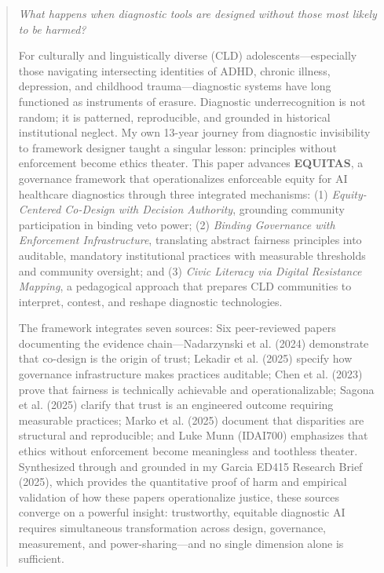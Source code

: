 \documentclass[12pt,a4paper]{article}
\begin{document}
\clearpage

\begin{abstract}

\textit{What happens when diagnostic tools are designed without those most likely to be harmed?}

For culturally and linguistically diverse (CLD) adolescents—especially those navigating intersecting identities of ADHD, chronic illness, depression, and childhood trauma—diagnostic systems have long functioned as instruments of erasure. Diagnostic underrecognition is not random; it is patterned, reproducible, and grounded in historical institutional neglect. My own 13-year journey from diagnostic invisibility to framework designer taught a singular lesson: principles without enforcement become ethics theater. This paper advances \textbf{EQUITAS}, a governance framework that operationalizes enforceable equity for AI healthcare diagnostics through three integrated mechanisms: (1) \textit{Equity-Centered Co-Design with Decision Authority}, grounding community participation in binding veto power; (2) \textit{Binding Governance with Enforcement Infrastructure}, translating abstract fairness principles into auditable, mandatory institutional practices with measurable thresholds and community oversight; and (3) \textit{Civic Literacy via Digital Resistance Mapping}, a pedagogical approach that prepares CLD communities to interpret, contest, and reshape diagnostic technologies.

\vspace{0.5em}

The framework integrates seven sources: Six peer-reviewed papers documenting the evidence chain—Nadarzynski et al. (2024) demonstrate that co-design is the origin of trust; Lekadir et al. (2025) specify how governance infrastructure makes practices auditable; Chen et al. (2023) prove that fairness is technically achievable and operationalizable; Sagona et al. (2025) clarify that trust is an engineered outcome requiring measurable practices; Marko et al. (2025) document that disparities are structural and reproducible; and Luke Munn (IDAI700) emphasizes that ethics without enforcement become meaningless and toothless theater. Synthesized through and grounded in my Garcia ED415 Research Brief (2025), which provides the quantitative proof of harm and empirical validation of how these papers operationalize justice, these sources converge on a powerful insight: trustworthy, equitable diagnostic AI requires simultaneous transformation across design, governance, measurement, and power-sharing—and no single dimension alone is sufficient.


\end{abstract}
\end{document}
